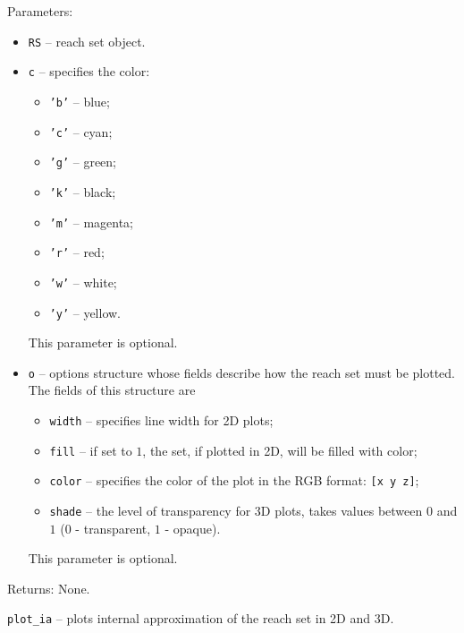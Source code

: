 Parameters:
\begin{itemize}
\item {\tt RS} -- reach set object.
\item {\tt c} -- specifies the color:
\begin{itemize}
\item {\tt 'b'} -- blue;
\item {\tt 'c'} -- cyan;
\item {\tt 'g'} -- green;
\item {\tt 'k'} -- black;
\item {\tt 'm'} -- magenta;
\item {\tt 'r'} -- red;
\item {\tt 'w'} -- white;
\item {\tt 'y'} -- yellow.
\end{itemize}
This parameter is optional.
\item {\tt o} -- options structure whose fields describe how the reach set
must be plotted. The fields of this structure are
\begin{itemize}
\item {\tt width} -- specifies line width for 2D plots;
\item {\tt fill} -- if set to $1$, the set, if plotted in 2D,
will be filled with color;
\item {\tt color} -- specifies the color of the plot in the RGB format:
{\tt [x y z]};
\item {\tt shade} -- the level of transparency for 3D plots, takes values
between $0$ and $1$ ($0$ - transparent, $1$ - opaque).
\end{itemize}
This parameter is optional.
\end{itemize}

Returns: None.

\newpage

{\Large {\tt plot\_ia}} -- plots internal approximation of the reach set
in 2D and 3D.

